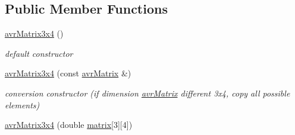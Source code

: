 \subsection*{Public Member Functions}
\begin{DoxyCompactItemize}
\item 
\hypertarget{classavr_matrix3x4_a36e9773d69e4fa970f8d0e20524a9aa5}{\hyperlink{classavr_matrix3x4_a36e9773d69e4fa970f8d0e20524a9aa5}{avr\-Matrix3x4} ()}\label{classavr_matrix3x4_a36e9773d69e4fa970f8d0e20524a9aa5}

\begin{DoxyCompactList}\small\item\em default constructor \end{DoxyCompactList}\item 
\hypertarget{classavr_matrix3x4_a391837f293aa73b064a41aca364d6a6b}{\hyperlink{classavr_matrix3x4_a391837f293aa73b064a41aca364d6a6b}{avr\-Matrix3x4} (const \hyperlink{classavr_matrix}{avr\-Matrix} \&)}\label{classavr_matrix3x4_a391837f293aa73b064a41aca364d6a6b}

\begin{DoxyCompactList}\small\item\em conversion constructor (if dimension \hyperlink{classavr_matrix}{avr\-Matrix} different 3x4, copy all possible elements) \end{DoxyCompactList}\item 
\hypertarget{classavr_matrix3x4_a24029bcb2ccf15bc449287bc6fbe8b26}{\hyperlink{classavr_matrix3x4_a24029bcb2ccf15bc449287bc6fbe8b26}{avr\-Matrix3x4} (double \hyperlink{classavr_matrix3x4_ab51a103b8c059a18324d4c675a47a0fa}{matrix}\mbox{[}3\mbox{]}\mbox{[}4\mbox{]})}\label{classavr_matrix3x4_a24029bcb2ccf15bc449287bc6fbe8b26}


\end{DoxyCompactItemize}

